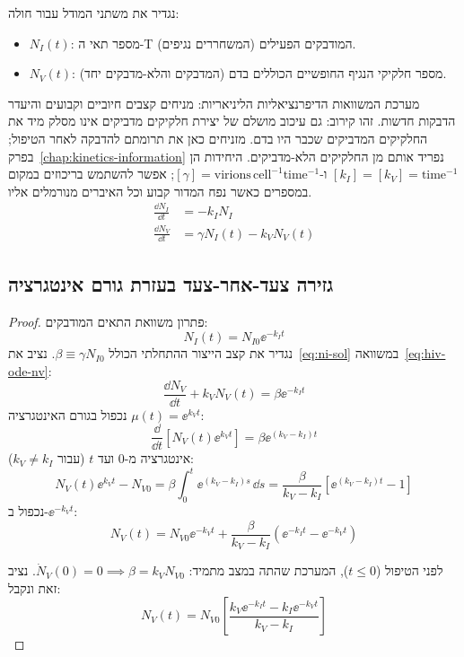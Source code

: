 נגדיר את משתני המודל עבור חולה:
\begin{itemize}
\item $N_I(t)$: מספר תאי ה-T המודבקים הפעילים (המשחררים נגיפים).
\item $N_V(t)$: מספר חלקיקי הנגיף החופשיים הכוללים בדם (המדבקים והלא-מדבקים יחד).
\end{itemize}

מערכת המשוואות הדיפרנציאליות הליניאריות:
מניחים קצבים חיוביים וקבועים והיעדר הדבקות חדשות. זהו קירוב: גם עיכוב מושלם של יצירת חלקיקים מדביקים אינו מסלק מיד את החלקיקים המדביקים שכבר היו בדם. מזניחים כאן את תרומתם להדבקה לאחר הטיפול; בפרק~\ref{chap:kinetics-information} נפריד אותם מן החלקיקים הלא-מדביקים. היחידות הן $[k_I]=[k_V]=\text{time}^{-1}$ ו-$[\gamma]=\text{virions}\,\text{cell}^{-1}\text{time}^{-1}$; אפשר להשתמש בריכוזים במקום במספרים כאשר נפח המדור קבוע וכל האיברים מנורמלים אליו.
\begin{align}
\frac{\dd N_I}{\dd t} &= -k_I N_I \label{eq:hiv-ode-ni}\\
\frac{\dd N_V}{\dd t} &= \gamma N_I(t) - k_V N_V(t) \label{eq:hiv-ode-nv}
\end{align}

\subsection{גזירה צעד-אחר-צעד בעזרת גורם אינטגרציה}\label{sec:hiv-derivation}
\begin{proof}
פתרון משוואת התאים המודבקים:
\begin{equation}\label{eq:ni-sol}
N_I(t) = N_{I0} \ee^{-k_I t}
\end{equation}
נגדיר את קצב הייצור ההתחלתי הכולל $\beta \equiv \gamma N_{I0}$. נציב את~\eqref{eq:ni-sol} במשוואה~\eqref{eq:hiv-ode-nv}:
\begin{equation}\label{eq:nv-inhom}
\frac{\dd N_V}{\dd t} + k_V N_V(t) = \beta \ee^{-k_I t}
\end{equation}
נכפול בגורם האינטגרציה $\mu(t) = \ee^{k_V t}$:
\begin{equation}
\frac{\dd}{\dd t}\left[ N_V(t) \ee^{k_V t} \right] = \beta \ee^{(k_V - k_I)t} \label{eq:nv-total-derivative}
\end{equation}
אינטגרציה מ-$0$ ועד $t$ (עבור $k_V \ne k_I$):
\begin{equation}
N_V(t)\ee^{k_V t} - N_{V0} = \beta \int_0^t \ee^{(k_V - k_I)s}\,\dd s = \frac{\beta}{k_V - k_I} \left[ \ee^{(k_V - k_I)t} - 1 \right]
\end{equation}
נכפול ב-$\ee^{-k_V t}$:
\begin{equation}\label{eq:nv-general-beta}
\boxed{N_V(t) = N_{V0} \ee^{-k_V t} + \frac{\beta}{k_V - k_I}\left(\ee^{-k_I t} - \ee^{-k_V t}\right)}
\end{equation}

לפני הטיפול ($t \le 0$), המערכת שהתה במצב מתמיד: $\dot{N}_V(0) = 0 \implies \beta = k_V N_{V0}$.
נציב זאת ונקבל:
\begin{equation}\label{eq:nv-normalized}
N_V(t) = N_{V0} \left[ \frac{k_V \ee^{-k_I t} - k_I \ee^{-k_V t}}{k_V - k_I} \right]
\end{equation}
\end{proof}

